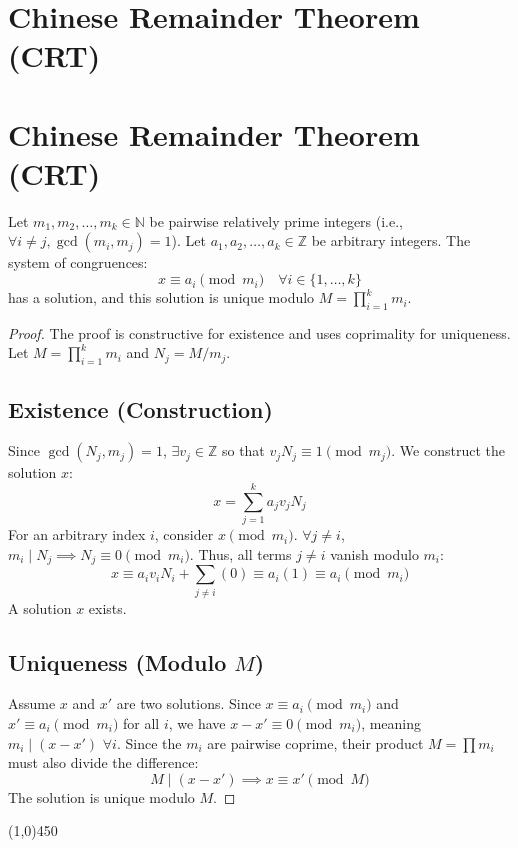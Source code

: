 \section{Chinese Remainder Theorem (CRT)}

\section*{Chinese Remainder Theorem (CRT)}

\begin{theorem}
Let $m_1, m_2, \dots, m_k \in \mathbb{N}$ be pairwise relatively prime integers (i.e., $\forall i \neq j, \gcd(m_i, m_j) = 1$). Let $a_1, a_2, \dots, a_k \in \mathbb{Z}$ be arbitrary integers.
The system of congruences:
$$ x \equiv a_i \pmod{m_i} \quad \forall i \in \{1, \dots, k\} $$
has a solution, and this solution is unique modulo $M = \prod_{i=1}^{k} m_i$.
\end{theorem}

\begin{proof}
The proof is constructive for existence and uses coprimality for uniqueness. Let $M = \prod_{i=1}^{k} m_i$ and $N_j = M/m_j$.

\subsection*{Existence (Construction)}
Since $\gcd(N_j, m_j) = 1$, $\exists v_j \in \mathbb{Z}$ so that $v_j N_j \equiv 1 \pmod{m_j}$.
We construct the solution $x$:
$$ x = \sum_{j=1}^{k} a_j v_j N_j $$
For an arbitrary index $i$, consider $x \pmod{m_i}$. $\forall j \neq i$, $m_i \mid N_j \implies N_j \equiv 0 \pmod{m_i}$.
Thus, all terms $j \neq i$ vanish modulo $m_i$:
$$ x \equiv a_i v_i N_i + \sum_{j \neq i} (0) \equiv a_i (1) \equiv a_i \pmod{m_i} $$
A solution $x$ exists.

\subsection*{Uniqueness (Modulo $M$)}
Assume $x$ and $x'$ are two solutions.
Since $x \equiv a_i \pmod{m_i}$ and $x' \equiv a_i \pmod{m_i}$ for all $i$, we have $x - x' \equiv 0 \pmod{m_i}$, meaning $m_i \mid (x - x')$ $\forall i$.
Since the $m_i$ are pairwise coprime, their product $M = \prod m_i$ must also divide the difference:
$$ M \mid (x - x') \implies x \equiv x' \pmod{M} $$
The solution is unique modulo $M$. \qedhere
\end{proof}

\begin{center}
    \line(1,0){450}
\end{center}